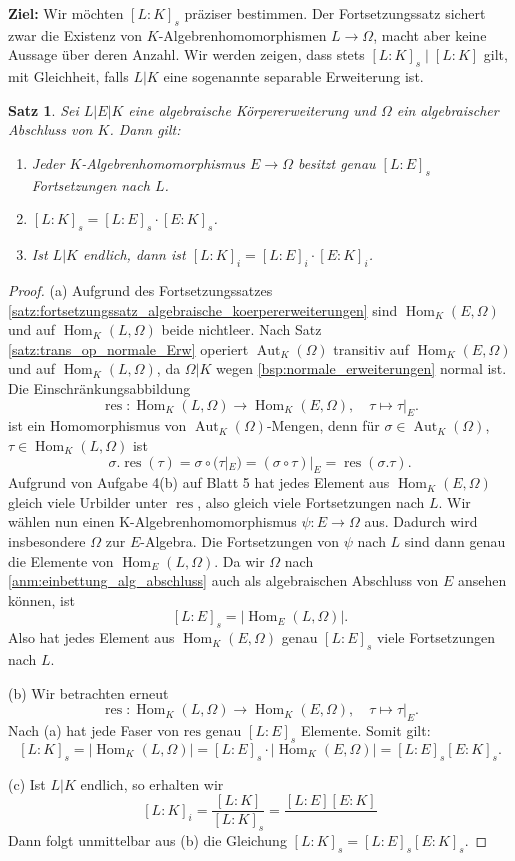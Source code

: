 \documentclass[a4paper, twoside, 11pt, ngerman]{report}
\DeclareMathOperator{\Aut}{Aut}
\DeclareMathOperator{\Hom}{Hom}
\DeclareMathOperator{\res}{res}
\theoremstyle{definistyle}
\newtheorem{satz}{Satz}[section]
\theoremstyle{remark}
\begin{document}
\textbf{Ziel:} Wir möchten $[L:K]_s$ präziser bestimmen. Der Fortsetzungssatz sichert zwar die Existenz von $K$-Algebrenhomomorphismen $L \to \Omega$, macht aber keine Aussage über deren Anzahl. Wir werden zeigen, dass stets $[L:K]_s \mid [L:K]$ gilt, mit Gleichheit, falls $L|K$ eine sogenannte separable Erweiterung ist.

\begin{satz}\label{satz:sepgrad}
Sei $L|E|K$ eine algebraische Körpererweiterung und $\Omega$ ein algebraischer Abschluss von $K$. Dann gilt:
\begin{enumerate}
\item[(a)] Jeder $K$-Algebrenhomomorphismus $E \to \Omega$ besitzt genau $[L:E]_s$ 
Fortsetzungen nach $L$.
\item[(b)] $[L:K]_s = [L:E]_s \cdot [E:K]_s$.
\item[(c)] Ist $L|K$ endlich, dann ist $[L:K]_i = [L:E]_i \cdot [E:K]_i$.
\end{enumerate}
\end{satz}
\begin{proof}
(a) Aufgrund des Fortsetzungssatzes \ref{satz:fortsetzungssatz_algebraische_koerpererweiterungen} sind
$\Hom_K(E,\Omega)$ und auf $\Hom_K(L,\Omega)$ beide nichtleer.
Nach Satz \ref{satz:trans_op_normale_Erw} operiert $\Aut_K(\Omega)$ transitiv auf $\Hom_K(E,\Omega)$ und auf $\Hom_K(L,\Omega)$, da $\Omega|K$ wegen \ref{bsp:normale_erweiterungen} normal ist. Die Einschränkungsabbildung
\[
\res: \Hom_K(L,\Omega) \to \Hom_K(E,\Omega), \quad \tau \mapsto \tau|_E.
\]
ist ein Homomorphismus von $\operatorname{Aut}_K(\Omega)$-Mengen, denn für $\sigma\in\Aut_K(\Omega)$, $\tau\in\Hom_K(L,\Omega)$ ist
\[
\sigma.\res(\tau)=\sigma\circ(\tau|_E)=(\sigma\circ\tau)|_E=\res(\sigma.\tau).
\]
Aufgrund von Aufgabe 4(b) auf Blatt 5 hat jedes Element aus $\Hom_K(E,\Omega)$ gleich viele Urbilder unter $\res$, also gleich viele Fortsetzungen nach $L$. 
Wir wählen nun einen K-Algebrenhomomorphismus $\psi\colon E\to\Omega$ aus. Dadurch wird insbesondere $\Omega$ zur $E$-Algebra. Die Fortsetzungen von $\psi$ nach $L$ sind dann genau die Elemente von $\Hom_E(L,\Omega)$. Da wir $\Omega$ nach \ref{anm:einbettung_alg_abschluss} auch als algebraischen Abschluss von $E$ ansehen können, ist
\[
[L:E]_s=|\Hom_E(L,\Omega)|.
\]
Also hat jedes Element aus $\Hom_K(E,\Omega)$ genau $[L:E]_s$ viele Fortsetzungen nach $L$.

(b) Wir betrachten erneut
\[
\res: \Hom_K(L,\Omega) \to \Hom_K(E,\Omega), \quad \tau \mapsto \tau|_E.
\]
Nach (a) hat jede Faser von $\mathrm{res}$ genau $[L:E]_s$ Elemente. Somit gilt:
\[
[L:K]_s = |\Hom_K(L,\Omega)| = [L:E]_s \cdot |\Hom_K(E,\Omega)| = [L:E]_s [E:K]_s.
\]

(c) Ist $L|K$ endlich, so erhalten wir
\[
[L:K]_i=\frac{[L:K]}{[L:K]_s}=\frac{[L:E][E:K]}{}
\]
Dann folgt unmittelbar aus (b) die Gleichung $[L:K]_s = [L:E]_s [E:K]_s$.
\end{proof}
\end{document}
